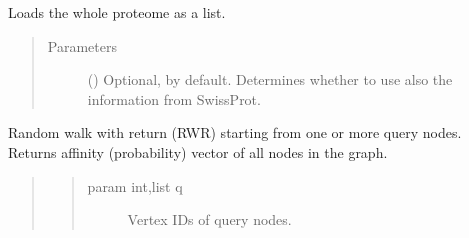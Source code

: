 \documentclass[letterpaper,10pt,english]{sphinxmanual}
\begin{document}
\begin{fulllineitems}
\begin{fulllineitems}
\begin{quote}
\begin{description}
\begin{itemize}
\end{itemize}

\end{description}\end{quote}

\end{fulllineitems}


\begin{fulllineitems}
\label{\detokenize{main:pypath.main.PyPath.proteins}}
\end{fulllineitems}


\begin{fulllineitems}
\label{\detokenize{main:pypath.main.PyPath.proteome_list}}
Loads the whole proteome as a list.
\begin{quote}\begin{description}
\item[{Parameters}] \leavevmode
{} () \textendash{} Optional,  by default. Determines whether to use
also the information from SwissProt.

\end{description}\end{quote}

\end{fulllineitems}


\begin{fulllineitems}
\label{\detokenize{main:pypath.main.PyPath.ps}}
\end{fulllineitems}


\begin{fulllineitems}
\label{\detokenize{main:pypath.main.PyPath.random_walk_with_return}}
Random walk with return (RWR) starting from one or more query nodes.
Returns affinity (probability) vector of all nodes in the graph.
\begin{quote}
\begin{quote}\begin{description}
\item[{param int,list q}] \leavevmode
Vertex IDs of query nodes.


\end{description}
\end{quote}
\end{quote}
\end{fulllineitems}
\end{fulllineitems}
\end{document}
